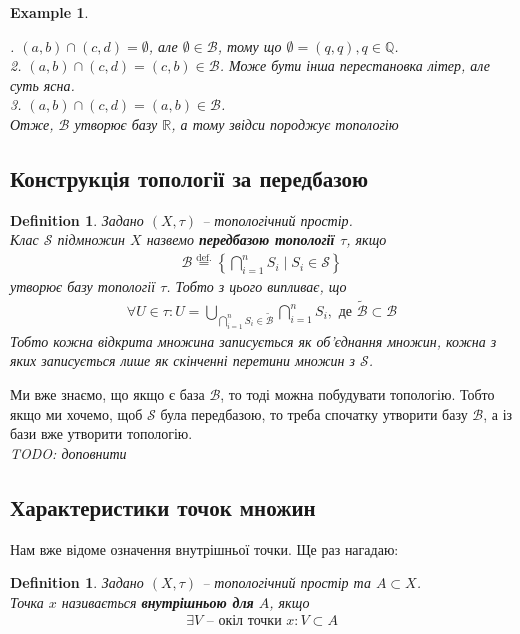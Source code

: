 \documentclass[a4paper, 10pt]{article}
\theoremstyle{theoremdd}
\newtheorem{definition}[theorem]{Definition}
\newtheorem{example}[theorem]{Example}
\begin{document}
\begin{example}
\begin{figure}[H]
\end{figure}
. $(a,b) \cap (c,d) = \emptyset$, але $\emptyset \in \mathcal{B}$, тому що $\emptyset = (q,q), q \in \mathbb{Q}$.\\
2. $(a,b) \cap (c,d) = (c,b) \in \mathcal{B}$. Може бути інша перестановка літер, але суть ясна.\\
3. $(a,b) \cap (c,d) = (a,b) \in \mathcal{B}$.\\
Отже, $\mathcal{B}$ утворює базу $\mathbb{R}$, а тому звідси породжує топологію
\fi
\end{example}

\subsection{Конструкція топології за передбазою}
\begin{definition}
Задано $(X,\tau)$ -- топологічний простір.\\
Клас $\mathcal{S}$ підмножин $X$ назвемо \textbf{передбазою топології $\tau$}, якщо
\begin{align*}
\mathcal{B} \overset{\text{def.}}{=} \left\{ \bigcap_{i=1}^n S_i \mid S_i \in \mathcal{S} \right\}
\end{align*}
утворює базу топології $\tau$. Тобто з цього випливає, що
\begin{align*}
\forall U \in \tau: U = \displaystyle\bigcup_{\bigcap_{i=1}^n S_i \in \mathcal{\tilde{B}}} \bigcap_{i=1}^n S_i, \text{ де } \mathcal{\tilde{B}} \subset \mathcal{B}
\end{align*}
Тобто кожна відкрита множина записується як об'єднання множин, кожна з яких записується лише як скінченні перетини множин з $\mathcal{S}$.
\end{definition}

\noindent Ми вже знаємо, що якщо є база $\mathcal{B}$, то тоді можна побудувати топологію. Тобто якщо ми хочемо, щоб $\mathcal{S}$ була передбазою, то треба спочатку утворити базу $\mathcal{B}$, а із бази вже утворити топологію.\\
\textit{TODO: доповнити}

\subsection{Характеристики точок множин}
\noindent Нам вже відоме означення внутрішньої точки. Ще раз нагадаю:
\begin{definition}
Задано $(X,\tau)$ -- топологічний простір та $A \subset X$.\\
Точка $x$ називається \textbf{внутрішньою для} $A$, якщо
\begin{align*}
\exists V \text{ -- окіл точки } x: V \subset A
\end{align*}
\end{definition}
\end{document}
